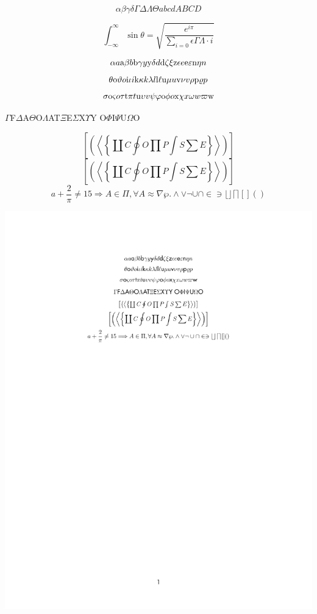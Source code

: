 \documentclass[12pt]{article}
\begin{document}
\[
\alpha\beta\gamma\delta \Gamma\Delta\Lambda\Theta abcd ABCD
\]

\[
\int_{-\infty}^{\infty}\sin\theta =
\sqrt{\frac{e^{i\pi}}{\sum_{i=0}{\epsilon}\Gamma\Lambda\cdot i}}
\]

\[
\alpha a \hbox{a} \beta b \hbox{b} \gamma y \hbox{y} \delta d \hbox{d} \zeta \xi
\hbox{z} \epsilon e \hbox{e} \varepsilon \hbox{n} \eta n
\]
\[
\theta \hbox{o} \vartheta o \hbox{i} \iota i \hbox{k} \kappa k \lambda l
\hbox{l} \ell \hbox{u} \mu u \hbox{v} \nu v \rho \hbox{p} \varrho p
\]
\[
\sigma \hbox{o} \varsigma o \tau \hbox{t} \pi t \hbox{u} \upsilon v \psi \varphi
\hbox{o} \phi o \hbox{x} \chi x \omega w \varpi \hbox{w}
\]
\begin{center}
$\Gamma$F$\Delta$A$\Theta$O$\Lambda$AT$\Xi$E$\Sigma$X$\Upsilon$Y
O$\Phi$I$\Psi$U$\Omega$O
\end{center}
\[
\textstyle
\left[\left(\left\langle\left\{
\coprod C \oint O \prod P \int S\sum E
\right\}\right\rangle\right)\right]
\]
\[
\left[\left(\left\langle\left\{
\coprod C \oint O \prod P \int S\sum E
\right\}\right\rangle\right)\right]
\]
\[
a + \frac{2}{\pi} \ne 15 \Longrightarrow A \in \Pi, \forall A \approx \nabla\wp.
\wedge \vee \neg \cup \cap \in \ni \lfloor \rfloor \lceil \rceil [ ] ( )
\]

\noindent\includegraphics*[trim=1in 6in 1in 1in]{testbad}
\end{document}

